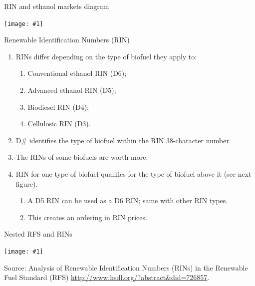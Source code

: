 \documentclass[table,xcolor=pdftex,dvipsnames]{beamer}\usepackage[]{graphicx}\usepackage[]{color}
\newcommand {\framedgraphic}[1] {
        \begin{center}
            \texttt{[image: \#1]}
        \end{center}
        \vspace{-1\baselineskip}
}
\begin{document}

\begin{frame}{RIN and ethanol markets diagram}
    \framedgraphic{Model_RIN.png}
\end{frame}


\begin{frame}{Renewable Identification Numbers (RIN)}
\begin{enumerate}[label=\textbullet]
    \item RINs differ depending on the type of biofuel they apply to:
      \begin{enumerate}[label=-]
          \item Conventional ethanol RIN (D6);
          \item Advanced ethanol RIN (D5);
          \item Biodiesel RIN (D4);
          \item Cellulosic RIN (D3).
      \end{enumerate}
    \item D\# identifies the type of biofuel within the RIN 38-character number.
    \item The RINs of some biofuels are worth more.
    \item RIN for one type of biofuel qualifies for the type of biofuel above it (see next figure).
      \begin{enumerate}[label=-]
          \item A D5 RIN can be used as a D6 RIN; same with other RIN types.
          \item This creates an ordering in RIN prices.
      \end{enumerate}
\end{enumerate}
\end{frame}


\begin{frame}{Nested RFS and RINs}
    \framedgraphic{Nested_RFS.png}
\scriptsize
Source: Analysis of Renewable Identification Numbers (RINs) in the Renewable Fuel Standard (RFS) \url{http://www.hsdl.org/?abstract&did=726857}.
\end{frame}

\end{document}

